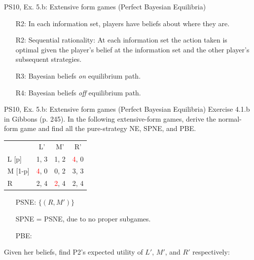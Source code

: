 \begin{frame}{PS10, Ex. 5.b: Extensive form games (Perfect Bayesian Equilibria)}
\begin{multicols}{2}
      \begin{itemize}
        \item[R2:] In each information set, players have beliefs about where they are.
        \item[R2:] Sequential rationality: At each information set the action taken is optimal given the player's belief at the information set and the other player's subsequent strategies.
        \item[R3:] Bayesian beliefs \textit{on} equilibrium path.
        \item[R4:] Bayesian beliefs \textit{off} equilibrium path.
      \end{itemize}
      \vfill\null
    \end{multicols}
\end{frame}
\begin{frame}{PS10, Ex. 5.b: Extensive form games (Perfect Bayesian Equilibria)}
    Exercise 4.1.b in Gibbons (p. 245). In the following extensive-form games, derive the normal-form game and find all the pure-strategy NE, SPNE, and PBE.
    \vspace{-8pt}
    \begin{multicols}{2}
      \begin{table}
        \begin{tabular}{l|c|c|c|}
          \multicolumn{1}{c}{} & \multicolumn{1}{c}{L'} & \multicolumn{1}{c}{M'} & \multicolumn{1}{c}{R'} \\\cline{2-4}
          L [p]   & 1, \color{blue}3 & 1, 2 & \textcolor{red}{4}, 0 \\\cline{2-4}
          M [1-p] & \textcolor{red}{4}, 0 & 0, 2 & 3, \color{blue}3 \\\cline{2-4}
          R       & 2, \color{blue}4 & \textcolor{red}{2}, \color{blue}4 & 2, \color{blue}4 \\\cline{2-4}
        \end{tabular}
      \end{table} \vspace{-4pt}
      \begin{itemize}
        \item[PSNE:] $\{(R,M')\}$
        \item[SPNE =] PSNE, due to no proper subgames.
        \item[PBE:]
      \end{itemize} \vspace{-4pt}
      Given her beliefs, find P2's expected utility of $L'$, $M'$, and $R'$ respectively: \vspace{-4pt}

\end{multicols}
\end{frame}
